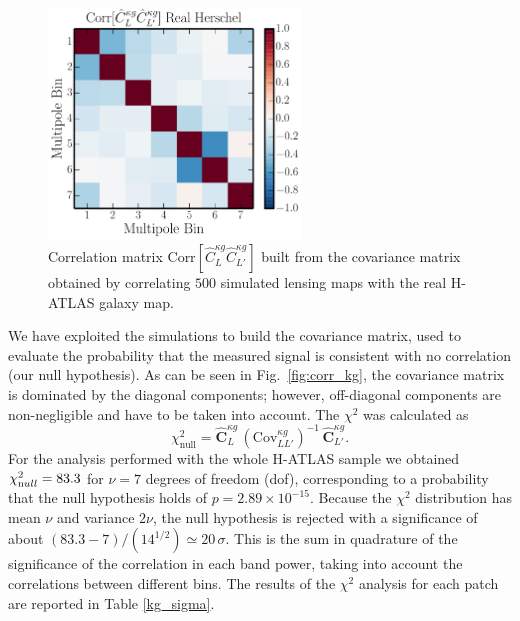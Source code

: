 \begin{figure} %
\centering %
\includegraphics[width=0.6\textwidth]{Chapter3/Images/f11}
\caption{Correlation matrix Corr$[\hat{C}^{\kappa g}_{L} \hat{C}^{\kappa g}_{L'} ]$ built from the covariance matrix obtained by correlating $500$ simulated lensing maps with the real H-ATLAS galaxy map. \label{fig:corr_kg}}
\end{figure}

We have exploited the simulations to build the covariance matrix, used to evaluate the probability that the measured signal is consistent with no correlation (our null hypothesis). As can be seen in Fig.~\eqref{fig:corr_kg}, the covariance matrix is dominated by the diagonal components; however, off-diagonal components are non-negligible and have to be taken into account. The $\chi^2$ was calculated as
\begin{equation}
\chi_{\text{null}}^2 = \hat{\mathbf{C}}^{\kappa g}_{L} \,(\text{Cov}^{\kappa g}_{LL'})^{-1}\, \hat{\mathbf{C}}^{\kappa g}_{L'}.
\end{equation}
%
For the analysis performed with the whole H-ATLAS sample we obtained $\chi_{\rm null}^2 = 83.3$ for $\nu = 7$ degrees of freedom (dof), corresponding to a probability that the null hypothesis holds of $p=2.89 \times 10^{-15}$.  Because the $\chi^2$ distribution has mean $\nu$ and variance $2\nu$, the null hypothesis is rejected with a significance of about $(83.3-7)/(14^{1/2})\simeq 20\,\sigma$. This is the sum in quadrature of the significance of the correlation in each band power, taking into account the correlations between different bins. The results of the $\chi^2$ analysis for each patch are reported in Table \eqref{kg_sigma}.

